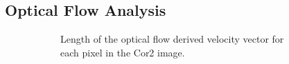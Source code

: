 \subsection{Optical Flow Analysis} \label{contributions:astro:spaceweather:opticalflow}
\begin{figure}
\centering
\begin{subfigure}[b]{0.32\textwidth}
    \caption{Length of the optical flow derived velocity vector for each pixel in the Cor2 image.}
    \label{contributions:astro:spaceweather:velocity:opticalflow}
\end{subfigure}
\hspace*{1cm}
\begin{subfigure}[b]{0.32\textwidth}

\end{subfigure}
\end{figure}
